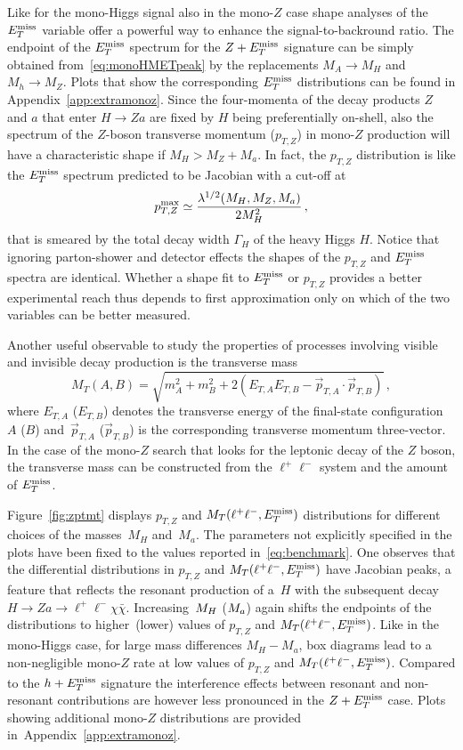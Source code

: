 Like for the mono-Higgs signal also in the mono-$Z$ case shape analyses of the~$E_T^\mathrm{miss}$ variable offer a powerful way to enhance the signal-to-backround ratio. The endpoint of the $E_T^\mathrm{miss}$ spectrum for the $Z+E_T^\mathrm{miss}$ signature can be simply obtained from~\eqref{eq:monoHMETpeak} by the replacements $M_A \to M_H$ and $M_h \to M_Z$. Plots that show the corresponding $E_T^\mathrm{miss}$ distributions can be found in Appendix~\ref{app:extramonoz}. Since the four-momenta of the decay products $Z$ and $a$ that enter $H \to Za$ are fixed by $H$ being preferentially on-shell, also the spectrum of the $Z$-boson transverse momentum ($p_{T,Z}$) in mono-$Z$ production will have a characteristic shape if $M_H > M_Z + M_a$. In fact,  the $p_{T,Z}$ distribution is like the $E_T^\mathrm{miss}$ spectrum predicted  to be Jacobian with a cut-off at~\cite{No:2015xqa,Bauer:2017ota}
\begin{equation} \label{eq:monoZpTpeak}
p_{T,Z}^{ {\rm max} } \simeq \frac{\lambda^{1/2}(M_H, M_Z, M_a)}{2 M_H^2}\,,
\end{equation}
that is smeared by the total decay width $\Gamma_H$ of the heavy Higgs $H$. Notice that  ignoring parton-shower and detector effects the shapes of the $p_{T,Z}$ and $E_T^\mathrm{miss}$ spectra are identical. Whether a shape fit to $E_T^\mathrm{miss}$ or $p_{T,Z}$ provides a better experimental reach thus depends to first approximation only on which of the two variables can be better measured.

Another useful observable to study the properties of processes involving visible and invisible decay production is the transverse mass 
\begin{equation} \label{eq:transversemass}
M_T (A,B) = \sqrt{m_A^2+m_B^2 + 2 \left (E_{T,A} E_{T,B} - \vec{p}_{T,A} \cdot \vec{p}_{T,B} \right )} \,,
\end{equation}
where $E_{T,A}$ ($E_{T,B}$) denotes the transverse energy of the final-state configuration $A$ ($B$) and~$\vec{p}_{T,A}$  ($\vec{p}_{T,B}$) is the corresponding transverse momentum three-vector. In the case of the mono-$Z$ search that looks for the leptonic decay of the $Z$ boson, the transverse mass can be constructed from the $\ell^+ \ell^-$ system and the amount of $E_T^\mathrm{miss}$.  

Figure~\ref{fig:zptmt} displays  $p_{T,Z}$ and $M_T(\ell^+ \ell^-, E_T^\mathrm{miss})$ distributions for different choices of the masses~$M_H$ and~$M_a$. The parameters not explicitly specified in the plots have been  fixed to the values reported in~\eqref{eq:benchmark}. One observes that the differential distributions in $p_{T,Z}$ and $M_T(\ell^+ \ell^-, E_T^\mathrm{miss})$ have Jacobian peaks, a feature that  reflects the resonant production of a~$H$ with the subsequent decay $H \to Z a \to \ell^+ \ell^- \chi \bar \chi$.  Increasing~$M_{H}$ ($M_{a}$) again shifts the endpoints of the distributions to higher~(lower) values of $p_{T,Z}$ and $M_T(\ell^+ \ell^-, E_T^\mathrm{miss})$. Like in the mono-Higgs case, for large mass differences $M_H - M_a$, box diagrams lead to a non-negligible mono-$Z$ rate at low values of $p_{T,Z}$ and $M_T(\ell^+ \ell^-, E_T^\mathrm{miss})$. Compared to the $h + E_T^\mathrm{miss}$ signature the interference effects between resonant and non-resonant contributions  are however  less pronounced  in  the $Z + E_T^\mathrm{miss}$  case. Plots showing additional  mono-$Z$ distributions are provided in~Appendix~\ref{app:extramonoz}. 

